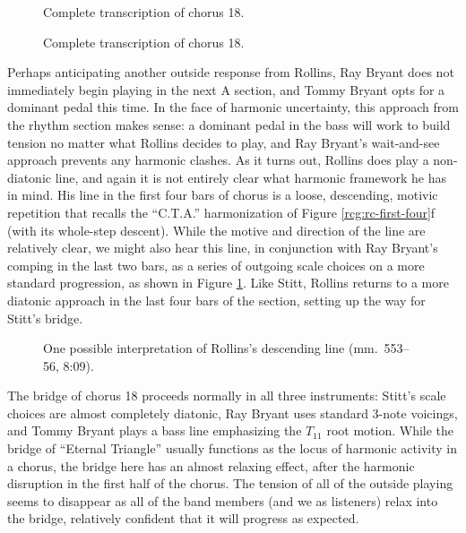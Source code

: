 \begin{figure}[p]
  \renewcommand{\theContinuedFloat}{ (continued)}
  \ContinuedFloat
  \caption[]{Complete transcription of chorus 18.}
\end{figure}

\begin{figure}[tp]
  \renewcommand{\theContinuedFloat}{ (continued)}
  \ContinuedFloat
  \caption[]{Complete transcription of chorus 18.}
\end{figure}

Perhaps anticipating another outside response from Rollins, Ray Bryant does
not immediately begin playing in the next A section, and Tommy Bryant opts for
a dominant pedal this time. In the face of harmonic uncertainty, this approach
from the rhythm section makes sense: a dominant pedal in the bass will work to
build tension no matter what Rollins decides to play, and Ray Bryant's
wait-and-see approach prevents any harmonic clashes. As it turns out, Rollins
does play a non-diatonic line, and again it is not entirely clear what
harmonic framework he has in mind. His line in the first four bars of chorus
 is a loose, descending, motivic repetition that recalls the
``C.T.A.'' harmonization of Figure \ref{rcg:rc-first-four}f (with its
whole-step descent). While the motive and direction of the line are relatively
clear, we might also hear this line, in conjunction with Ray Bryant's comping
in the last two bars, as a series of outgoing scale choices on a more standard
progression, as shown in Figure \ref{et:sr-desc-motive}. Like Stitt, Rollins
returns to a more diatonic approach in the last four bars of the section,
setting up the way for Stitt's bridge.

\begin{figure}[tbp]
  \caption[One possible interpretation of Rollins's descending line.]{%
    One possible interpretation of Rollins's descending line (mm.~553--56,
    8:09).}
  \label{et:sr-desc-motive}
\end{figure}

The bridge of chorus 18 proceeds normally in all three instruments: Stitt's
scale choices are almost completely diatonic, Ray Bryant uses standard 3-note
voicings, and Tommy Bryant plays a bass line emphasizing the $T_{11}$ root
motion. While the bridge of ``Eternal Triangle'' usually functions as the
locus of harmonic activity in a chorus, the bridge here has an almost relaxing
effect, after the harmonic disruption in the first half of the chorus. The
tension of all of the outside playing seems to disappear as all of the band
members (and we as listeners) relax into the bridge, relatively confident that
it will progress as expected.

